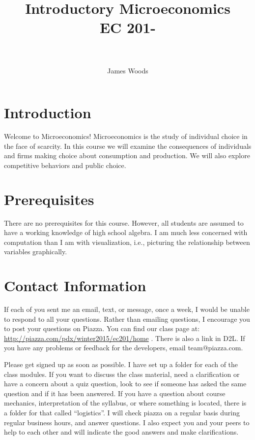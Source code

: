 \documentclass[letterpaper,10pt]{article}
\title{
Introductory Microeconomics\\
EC 201-\Section \\
\Term\\
}
\author{James Woods}
\date{}
\begin{document}
\maketitle

\section{Introduction}

Welcome to Microeconomics! Microeconomics is the study of individual
choice in the face of scarcity. In this course we will examine the
consequences of individuals and firms making choice about consumption
and production. We will also explore competitive behaviors and public
choice.

\section{Prerequisites}

There are no prerequisites for this course. However, all students are
assumed to have a working knowledge of high school algebra. I am much
less concerned with computation than I am with visualization, i.e.,
picturing the relationship between variables graphically.


\section{Contact Information}
If each of you sent me an email, text, or message, once a week, I would be unable to respond to all your questions.  Rather than emailing questions, I encourage you to post your questions on Piazza. You can find our class page at: \url{http://piazza.com/pdx/winter2015/ec201/home} .  There is also a link in D2L. If you have any problems or feedback for the developers, email team@piazza.com.

Please get signed up as soon as possible. I have set up a
folder for each of the class modules. If you want to discuss the class material, need a clarification or have a concern about a quiz question, look to see if someone has asked the same question and if it has been answered. 
If you have a question about course mechanics, interpretation of the
syllabus, or where something is located, there is a folder for
that called ``logistics''. I will check piazza on a regular basis during regular business hours, and answer questions. I also expect you and your peers to help to each other and will indicate the good answers and make clarifications.  
\end{document}

